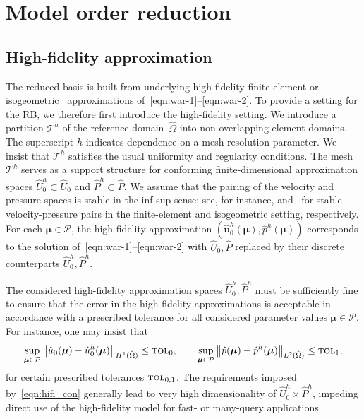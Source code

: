 \documentclass[onecolumn, twoside, a4paper, 11pt]{article}
\begin{document}
\section{Model order reduction}
\label{sec:reduction}

\subsection{High-fidelity approximation}
The reduced basis is built from underlying high-fidelity finite-element or isogeometric~\cite{Cottrell2009iat}
approximations of~\eqref{eqn:war-1}--\eqref{eqn:war-2}. To provide a setting for the RB, we therefore
first introduce the high-fidelity setting.
We introduce a partition $\mathcal{T}^h$ of the reference domain~$\hat{\Omega}$ into non-overlapping
element domains. The superscript $h$ indicates dependence
on a mesh-resolution parameter. We insist that $\mathcal{T}^h$ satisfies the usual uniformity and
regularity conditions. The mesh $\mathcal{T}^h$ serves as a support structure for conforming
finite-dimensional approximation spaces $\hat{U}_0^h\subset\hat{U}_0$ and $\hat{P}^h\subset\hat{P}$.
We assume that the pairing of the velocity and pressure spaces is stable in the inf-sup sense; see,
for instance, \cite{Taylor1973nsn,Nedelec1986nfm,Raviart1981mfe,Johannessen2015dcd}
and~\cite{Evans2013idc1,Evans2013idc3,Buffa2011ias} for stable velocity-pressure pairs in
the finite-element and isogeometric setting,
respectively. For each $\bm{\mu}\in\mathcal{P}$, the high-fidelity approximation
$(\hat{\bm{u}}_0^h(\bm{\mu}),\hat{p}^h(\bm{\mu}))$ corresponds to the solution
of~\eqref{eqn:war-1}\nobreakdash--\eqref{eqn:war-2} with $\hat{U}_0,\hat{P}$ replaced by their
discrete counterparts $\hat{U}_0^h,\hat{P}^h$.

The considered high-fidelity approximation spaces $\hat{U}_0^h,\hat{P}^h$ must be sufficiently fine to
ensure that the error in the high-fidelity approximations is acceptable in accordance with a prescribed tolerance
for all considered parameter values $\bm{\mu}\in\mathcal{P}$. For instance, one may insist that
%
\begin{equation}
\label{eqn:hifi_con}
\sup_{\bm{\mu}\in\mathcal{P}}
\big\|\hat{u}_0(\bm{\mu})-\hat{u}_0^h(\bm{\mu})\big\|_{H^1(\hat{\Omega})}\leq\textsc{tol}_0,
\qquad
\sup_{\bm{\mu}\in\mathcal{P}}
\big\|\hat{p}(\bm{\mu})-\hat{p}^h(\bm{\mu})\big\|_{L^2(\hat{\Omega})}\leq\textsc{tol}_1,
\end{equation}
%
for certain prescribed tolerances $\textsc{tol}_{0,1}$.
The requirements imposed by~\eqref{eqn:hifi_con} generally lead to very high dimensionality of $\hat{U}_0^h\times\hat{P}^h$,
impeding direct use of the high-fidelity model for fast- or many-query applications.
\end{document}
